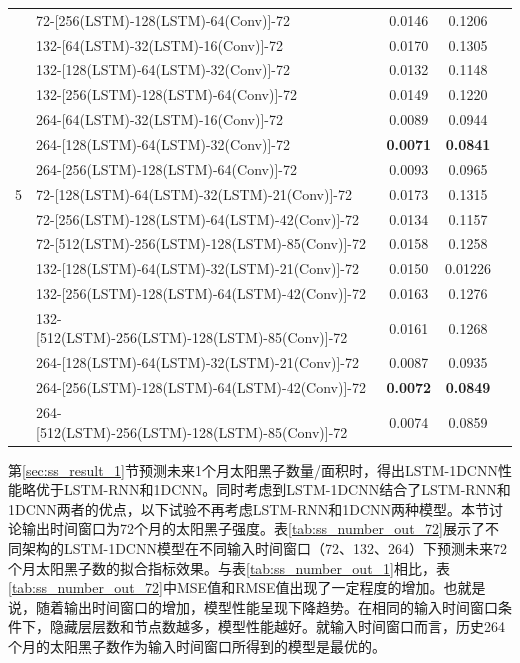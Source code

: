 \begin{table}[!htbp]
\begin{tabular}{clccc}
      & 72-[256(LSTM)-128(LSTM)-64(Conv)]-72 & 0.0146 & 0.1206 \\
      & 132-[64(LSTM)-32(LSTM)-16(Conv)]-72 & 0.0170 & 0.1305 \\
      & 132-[128(LSTM)-64(LSTM)-32(Conv)]-72 & 0.0132 & 0.1148 \\
      & 132-[256(LSTM)-128(LSTM)-64(Conv)]-72 & 0.0149 & 0.1220 \\
      & 264-[64(LSTM)-32(LSTM)-16(Conv)]-72 & 0.0089 & 0.0944 \\
      & 264-[128(LSTM)-64(LSTM)-32(Conv)]-72 & \textbf{0.0071} & \textbf{0.0841} \\
      & 264-[256(LSTM)-128(LSTM)-64(Conv)]-72 & 0.0093 & 0.0965 \\
    \hline
    5 & 72-[128(LSTM)-64(LSTM)-32(LSTM)-21(Conv)]-72 & 0.0173 & 0.1315 \\
      & 72-[256(LSTM)-128(LSTM)-64(LSTM)-42(Conv)]-72 & 0.0134 & 0.1157 \\
      & 72-[512(LSTM)-256(LSTM)-128(LSTM)-85(Conv)]-72 & 0.0158 & 0.1258 \\
      & 132-[128(LSTM)-64(LSTM)-32(LSTM)-21(Conv)]-72 & 0.0150 & 0.01226 \\
      & 132-[256(LSTM)-128(LSTM)-64(LSTM)-42(Conv)]-72 & 0.0163 & 0.1276 \\
      & 132-[512(LSTM)-256(LSTM)-128(LSTM)-85(Conv)]-72 & 0.0161 &  0.1268\\
      & 264-[128(LSTM)-64(LSTM)-32(LSTM)-21(Conv)]-72 & 0.0087 & 0.0935 \\
      & 264-[256(LSTM)-128(LSTM)-64(LSTM)-42(Conv)]-72 & \textbf{0.0072} & \textbf{0.0849} \\
      & 264-[512(LSTM)-256(LSTM)-128(LSTM)-85(Conv)]-72 & 0.0074 & 0.0859 \\
    \bottomrule
  \end{tabular}
\end{table}

第\ref{sec:ss_result_1}节预测未来1个月太阳黑子数量/面积时，得出LSTM-1DCNN性能略优于LSTM-RNN和1DCNN。同时考虑到LSTM-1DCNN结合了LSTM-RNN和1DCNN两者的优点，以下试验不再考虑LSTM-RNN和1DCNN两种模型。本节讨论输出时间窗口为72个月的太阳黑子强度。表\ref{tab:ss_number_out_72}展示了不同架构的LSTM-1DCNN模型在不同输入时间窗口（72、132、264）下预测未来72个月太阳黑子数的拟合指标效果。与表\ref{tab:ss_number_out_1}相比，表\ref{tab:ss_number_out_72}中MSE值和RMSE值出现了一定程度的增加。也就是说，随着输出时间窗口的增加，模型性能呈现下降趋势。在相同的输入时间窗口条件下，隐藏层层数和节点数越多，模型性能越好。就输入时间窗口而言，历史264个月的太阳黑子数作为输入时间窗口所得到的模型是最优的。

